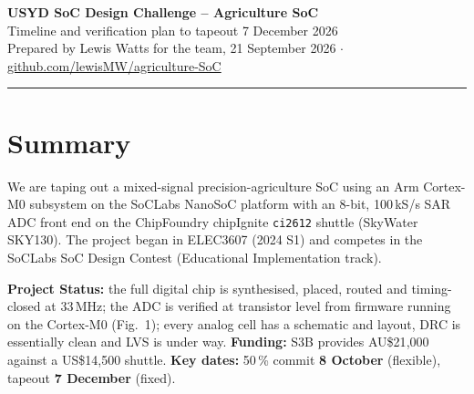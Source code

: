 \documentclass[10pt,a4paper]{article}
\renewcommand{\small}{\fontsize{8.6}{10.3}\selectfont}
\begin{document}
{\LARGE\bfseries USYD SoC Design Challenge -- Agriculture SoC}\\[1pt]
{\large Timeline and verification plan to tapeout 7 December 2026}\\[2pt]
{\small Prepared by Lewis Watts for the team, 21 September 2026 \;$\cdot$\; \href{https://github.com/lewisMW/agriculture-SoC}{github.com/lewisMW/agriculture-SoC}}

\vspace{3pt}\hrule\vspace{3pt}

\section*{Summary}
We are taping out a mixed-signal precision-agriculture SoC using an Arm Cortex-M0 subsystem on the SoCLabs NanoSoC platform with an 8-bit, 100\,kS/s SAR ADC front end on the ChipFoundry chipIgnite \texttt{ci2612} shuttle (SkyWater SKY130). The project began in ELEC3607 (2024 S1) and competes in the SoCLabs SoC Design Contest (Educational Implementation track).

\textbf{Project Status:} the full digital chip is synthesised, placed, routed and timing-closed at 33\,MHz; the ADC is verified at transistor level from firmware running on the Cortex-M0 (Fig.~1); every analog cell has a schematic and layout, DRC is essentially clean and LVS is under way.
\textbf{Funding:} S3B provides AU\$21{,}000 against a US\$14{,}500 shuttle. \textbf{Key dates:} 50\,\% commit \textbf{8 October} (flexible), tapeout \textbf{7 December} (fixed).
\end{document}
